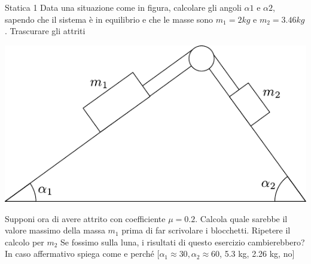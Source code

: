 \begin{esercizio}{Statica 1}
	Data una situazione come in figura, calcolare gli angoli $ \alpha 1 $ e $ \alpha 2 $, sapendo che il sistema è in equilibrio e che le masse sono $ m_1 = 2 kg $ e $ m_2 = 3.46 kg $. Trascurare gli attriti
	\begin{center}
		\includegraphics{Images/Statica1.pdf }
	\end{center}
	Supponi ora di avere attrito con coefficiente $ \mu  = 0.2 $. Calcola quale sarebbe il valore massimo della massa $ m_1 $ prima di far scrivolare i blocchetti. Ripetere il calcolo per $ m_2 $
	\vskip3mm
	Se fossimo sulla luna, i risultati di questo esercizio cambierebbero? In caso affermativo spiega come e perché
	\vskip3mm
	\hfill[$ \alpha_1 \approx 30, \alpha_2 \approx 60$, 5.3 kg, 2.26 kg,  no]
\end{esercizio}

